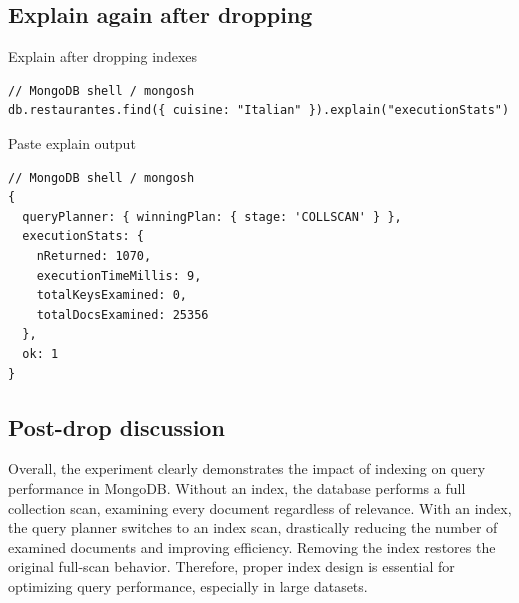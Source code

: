 \documentclass[11pt, letterpaper]{article}
\begin{document}
\subsection{Explain again after dropping}
\begin{labstep}{Explain after dropping indexes}
\begin{lstlisting}
// MongoDB shell / mongosh
db.restaurantes.find({ cuisine: "Italian" }).explain("executionStats")
\end{lstlisting}
\end{labstep}

\begin{labstep}{Paste explain output}
\begin{lstlisting}
// MongoDB shell / mongosh
{
  queryPlanner: { winningPlan: { stage: 'COLLSCAN' } },
  executionStats: {
    nReturned: 1070,
    executionTimeMillis: 9,
    totalKeysExamined: 0,
    totalDocsExamined: 25356
  },
  ok: 1
}
\end{lstlisting}
\end{labstep}

\subsection{Post-drop discussion}
Overall, the experiment clearly demonstrates the impact of indexing on query performance in MongoDB. Without an index, the database performs a full collection scan, examining every document regardless of relevance. With an index, the query planner switches to an index scan, drastically reducing the number of examined documents and improving efficiency. Removing the index restores the original full-scan behavior. Therefore, proper index design is essential for optimizing query performance, especially in large datasets.

\vspace{2.0cm}
\end{document}

